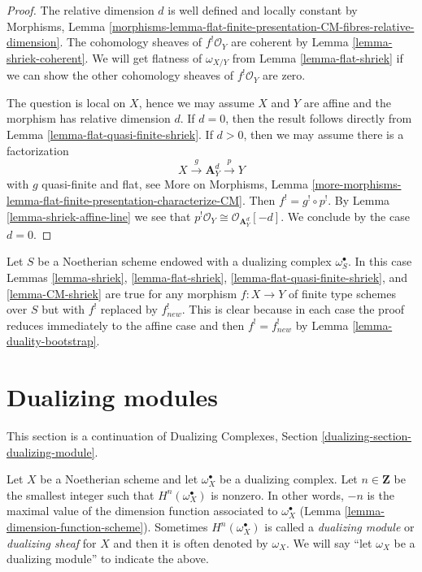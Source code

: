 \begin{proof}
The relative dimension $d$ is well defined and locally constant by
Morphisms, Lemma
\ref{morphisms-lemma-flat-finite-presentation-CM-fibres-relative-dimension}.
The cohomology sheaves of $f^!\mathcal{O}_Y$ are coherent by
Lemma \ref{lemma-shriek-coherent}.
We will get flatness of $\omega_{X/Y}$ from Lemma \ref{lemma-flat-shriek}
if we can show the other cohomology sheaves of $f^!\mathcal{O}_Y$
are zero.

\medskip\noindent
The question is local on $X$, hence we may assume $X$ and $Y$ are affine
and the morphism has relative dimension $d$. If $d = 0$, then the
result follows directly from Lemma \ref{lemma-flat-quasi-finite-shriek}.
If $d > 0$, then we may assume there is a factorization
$$
X \xrightarrow{g} \mathbf{A}^d_Y \xrightarrow{p} Y
$$
with $g$ quasi-finite and flat, see More on Morphisms, Lemma
\ref{more-morphisms-lemma-flat-finite-presentation-characterize-CM}.
Then $f^! = g^! \circ p^!$. By Lemma \ref{lemma-shriek-affine-line}
we see that $p^!\mathcal{O}_Y \cong \mathcal{O}_{\mathbf{A}^d_Y}[-d]$.
We conclude by the case $d = 0$.
\end{proof}

\begin{remark}
\label{remark-the-same-is-true}
Let $S$ be a Noetherian scheme endowed with a dualizing complex
$\omega_S^\bullet$. In this case
Lemmas \ref{lemma-shriek}, \ref{lemma-flat-shriek},
\ref{lemma-flat-quasi-finite-shriek}, and \ref{lemma-CM-shriek}
are true for any morphism $f : X \to Y$ of finite type schemes over $S$
but with $f^!$ replaced by $f_{new}^!$. This is clear because in each
case the proof reduces immediately to the affine case
and then $f^! = f_{new}^!$ by Lemma \ref{lemma-duality-bootstrap}.
\end{remark}




\section{Dualizing modules}
\label{section-dualizing-module}


\noindent
This section is a continuation of
Dualizing Complexes, Section \ref{dualizing-section-dualizing-module}.

\medskip\noindent
Let $X$ be a Noetherian scheme and let $\omega_X^\bullet$ be a
dualizing complex. Let $n \in \mathbf{Z}$ be the smallest integer such that
$H^n(\omega_X^\bullet)$ is nonzero. In other words, $-n$ is the maximal
value of the dimension function associated to $\omega_X^\bullet$
(Lemma \ref{lemma-dimension-function-scheme}).
Sometimes $H^n(\omega_X^\bullet)$
is called a {\it dualizing module} or {\it dualizing sheaf}
for $X$ and then it is often denoted
by $\omega_X$. We will say ``let $\omega_X$ be a dualizing module''
to indicate the above.

